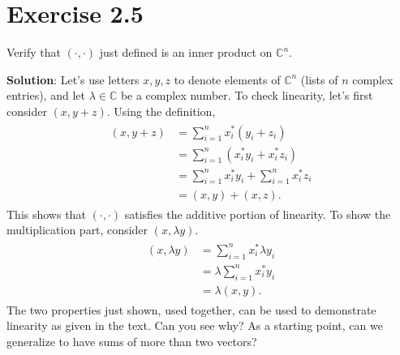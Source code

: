 \documentclass{book}
\begin{document}
\section*{Exercise 2.5}
    Verify that $(\cdot,\cdot)$ just defined is an inner product on $\mathbb{C}^n$.
    
    \textbf{Solution}: Let's use letters $x, y, z$ to denote elements of $\mathbb{C}^n$ (lists of $n$ complex entries), and let $\lambda \in \mathbb{C}$ be a complex number. To check linearity, let's first consider $(x, y+z)$. Using the definition,
    \begin{align}
    \begin{aligned}
        (x, y+z) &= \sum_{i=1}^n x_i^* (y_i + z_i) \\
        &= \sum_{i=1}^n (x_i^* y_i + x_i^* z_i) \\
        &= \sum_{i=1}^n x_i^* y_i + \sum_{i=1}^n x_i^* z_i \\
        &= (x, y) + (x,z).
    \end{aligned}
    \end{align}
    This shows that $(\cdot, \cdot)$ satisfies the additive portion of linearity. To show the multiplication part, consider $(x, \lambda y)$.
    \begin{align}
    \begin{aligned}
        (x, \lambda y) &= \sum_{i=1}^n x_i^* \lambda y_i \\
        &= \lambda \sum_{i=1}^n x_i^* y_i \\
        &= \lambda (x,y).
    \end{aligned}
    \end{align}
    The two properties just shown, used together, can be used to demonstrate linearity as given in the text. Can you see why? As a starting point, can we generalize to have sums of more than two vectors?
    
\end{document}
